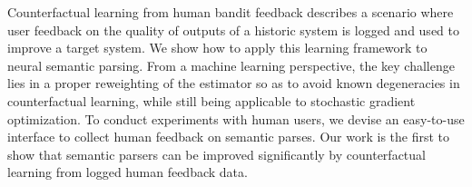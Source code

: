 Counterfactual learning from human bandit feedback describes a scenario where user feedback on the quality of outputs of a historic system is logged and used to improve a target system. We show how to apply this learning framework to neural semantic parsing. From a machine learning perspective, the key challenge lies in a proper reweighting of the estimator so as to avoid known degeneracies in counterfactual learning, while still being applicable to stochastic gradient optimization. To conduct experiments with human users, we devise an easy-to-use interface to collect human feedback on semantic parses. Our work is the first to show that semantic parsers can be improved significantly by counterfactual learning from logged human feedback data.
